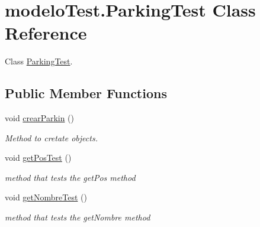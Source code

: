 \hypertarget{classmodelo_test_1_1_parking_test}{}\section{modelo\+Test.\+Parking\+Test Class Reference}
\label{classmodelo_test_1_1_parking_test}


Class \mbox{\hyperlink{classmodelo_test_1_1_parking_test}{Parking\+Test}}.  


\subsection*{Public Member Functions}
\begin{DoxyCompactItemize}
\item 
\mbox{\label{classmodelo_test_1_1_parking_test_a7ea498d3b00e02fb37ad52fc5ecb0e9f}} 
void \mbox{\hyperlink{classmodelo_test_1_1_parking_test_a7ea498d3b00e02fb37ad52fc5ecb0e9f}{crear\+Parkin}} ()
\begin{DoxyCompactList}\small\item\em Method to cretate objects. \end{DoxyCompactList}\item 
\mbox{\label{classmodelo_test_1_1_parking_test_ae8b007838472b362cbfb6dcefbad5f15}} 
void \mbox{\hyperlink{classmodelo_test_1_1_parking_test_ae8b007838472b362cbfb6dcefbad5f15}{get\+Pos\+Test}} ()
\begin{DoxyCompactList}\small\item\em method that tests the get\+Pos method \end{DoxyCompactList}\item 
\mbox{\label{classmodelo_test_1_1_parking_test_a0e4083aeae6b528cdbe884f6d98c76a4}} 
void \mbox{\hyperlink{classmodelo_test_1_1_parking_test_a0e4083aeae6b528cdbe884f6d98c76a4}{get\+Nombre\+Test}} ()
\begin{DoxyCompactList}\small\item\em method that tests the get\+Nombre method \end{DoxyCompactList}\item 
\mbox{\label{classmodelo_test_1_1_parking_test_aac705e55fd569089a815b3a6f6b37e1c}} 

\end{DoxyCompactItemize}
